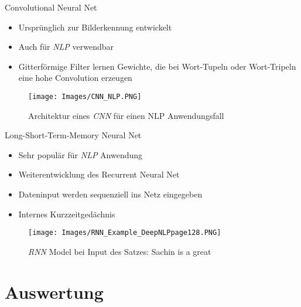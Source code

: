 \documentclass[8pt, xcolor = dvipsnames]{beamer}
\begin{document}
\begin{frame}{Convolutional Neural Net}
\begin{itemize}
    \item Ursprünglich zur Bilderkennung entwickelt
    \item Auch für \textit{NLP} verwendbar
    \item Gitterförmige Filter lernen Gewichte, die bei Wort-Tupeln oder Wort-Tripeln eine hohe Convolution erzeugen
\end{itemize}{}  

\begin{figure}[!ht]
\begin{center}
\texttt{[image: Images/CNN\_NLP.PNG]}
\caption{Architektur eines \textit{CNN} für einen NLP Anwendungsfall}
\label{abb:CNN_NLP}
\end{center}
\end{figure}
\end{frame}{}

\begin{frame}{Long-Short-Term-Memory Neural Net}
\begin{itemize}
  \item Sehr populär für \textit{NLP} Anwendung
  \item Weiterentwicklung des Recurrent Neural Net
  \item Dateninput werden sequenziell ins Netz eingegeben
  \item Internes  Kurzzeitgedächnis
\end{itemize}{}  

    \begin{figure}[!ht]
\begin{center}
\texttt{[image: Images/RNN\_Example\_DeepNLPpage128.PNG]}
\caption{\textit{RNN} Model bei Input des Satzes: Sachin is a great }
\label{abb:RNNExample}
\end{center}
\end{figure}
\end{frame}{}

\section{Auswertung}
\end{document}
